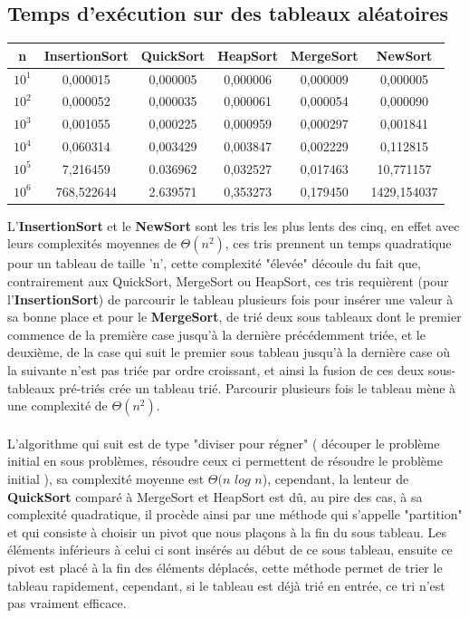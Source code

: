 \documentclass[a4paper, 11pt, oneside]{article}
\begin{document}
\subsection{Temps d'exécution sur des tableaux aléatoires}

\begin{table}[htb]
\begin{tabular}{cccccc}
\hline

n   & InsertionSort & QuickSort & HeapSort & MergeSort & NewSort \\ \hline
$10^{1}$ & 0,000015      & 0,000005  & 0,000006         & 0,000009          & 0,000005        \\
$10^{2}$ & 0,000052      & 0,000035  & 0,000061         & 0,000054          & 0,000090        \\
$10^{3}$ & 0,001055      & 0,000225  & 0,000959         & 0,000297          & 0,001841        \\
$10^{4}$ & 0,060314      & 0,003429  & 0,003847         & 0,002229          & 0,112815        \\
$10^{5}$ & 7,216459      & 0.036962  & 0,032527         & 0,017463           & 10,771157        \\
$10^{6}$ & 768,522644    & 2.639571  & 0,353273         & 0,179450          & 1429,154037
        
\end{tabular}
\end{table}

L'\textbf{InsertionSort} et le \textbf{NewSort} sont les tris les plus lents des cinq, en effet avec leurs complexités moyennes de $\Theta(n^{2})$, ces tris prennent un temps quadratique pour un tableau de taille 'n', cette complexité "élevée" découle du fait que, contrairement aux QuickSort, MergeSort ou HeapSort, ces tris requièrent (pour l'\textbf{InsertionSort}) de parcourir le tableau plusieurs fois pour insérer une valeur à sa bonne place et pour le \textbf{MergeSort}, de trié deux sous tableaux dont le premier commence de la première case jusqu'à la dernière précédemment triée, et le deuxième, de la case qui suit le premier sous tableau jusqu'à la dernière case où la suivante  n'est pas triée par ordre croissant, et ainsi la fusion de ces deux sous-tableaux pré-triés crée un tableau trié.
 Parcourir plusieurs fois le tableau mène à une complexité de $\Theta(n^{2})$.
\\
\\
\indent L'algorithme qui suit est de type "diviser pour régner" ( découper le problème initial en sous problèmes, résoudre ceux ci permettent de résoudre le problème initial ), sa complexité moyenne est $\Theta(n$ $log$ $n$), cependant, la lenteur de \textbf{QuickSort} comparé à MergeSort et HeapSort est dû, au pire des cas, à sa complexité quadratique, il procède ainsi par une méthode qui s'appelle "partition" et qui consiste à choisir un pivot que nous plaçons à la fin du sous tableau. Les éléments inférieurs à celui ci sont insérés au début de ce sous tableau, ensuite ce pivot est placé à la fin des éléments déplacés, cette méthode permet de trier le tableau rapidement, cependant, si le tableau est déjà trié en entrée, ce tri n'est pas vraiment efficace.\\ 
\end{document}
